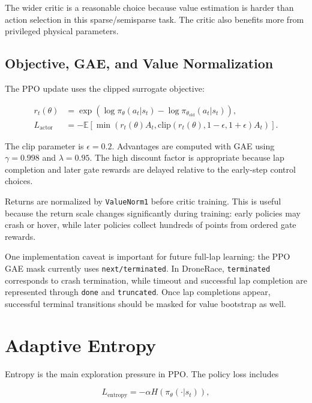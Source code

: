\documentclass[11pt]{article}
\begin{document}
The wider critic is a reasonable choice because value estimation is harder than
action selection in this sparse/semisparse task. The critic also benefits more
from privileged physical parameters.

\subsection{Objective, GAE, and Value Normalization}

The PPO update uses the clipped surrogate objective:

\begin{align}
r_t(\theta) &=
\exp\left(\log \pi_\theta(a_t|s_t) -
          \log \pi_{\theta_{\mathrm{old}}}(a_t|s_t)\right), \\
L_{\mathrm{actor}} &=
-\mathbb{E}\left[
\min\left(
r_t(\theta) A_t,
\mathrm{clip}(r_t(\theta), 1-\epsilon, 1+\epsilon) A_t
\right)\right].
\end{align}

The clip parameter is \(\epsilon=0.2\). Advantages are computed with GAE using
\(\gamma=0.998\) and \(\lambda=0.95\). The high discount factor is appropriate
because lap completion and later gate rewards are delayed relative to the
early-step control choices.

Returns are normalized by \texttt{ValueNorm1} before critic training. This is
useful because the return scale changes significantly during training: early
policies may crash or hover, while later policies collect hundreds of points
from ordered gate rewards.

One implementation caveat is important for future full-lap learning: the PPO
GAE mask currently uses \texttt{next/terminated}. In DroneRace,
\texttt{terminated} corresponds to crash termination, while timeout and
successful lap completion are represented through \texttt{done} and
\texttt{truncated}. Once lap completions appear, successful terminal
transitions should be masked for value bootstrap as well.

\section{Adaptive Entropy}

Entropy is the main exploration pressure in PPO. The policy loss includes

\begin{equation}
L_{\mathrm{entropy}} = -\alpha H(\pi_\theta(\cdot|s_t)),
\end{equation}
\end{document}
